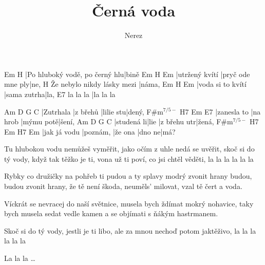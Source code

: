 \documentclass{song}
\title{Černá voda}
\author{Nerez}
\renewcommand{\-}{$^{7/5-}$}
\begin{document}
\strophe
Em                            H
|Po hluboký vodě, po černý hlu|bině
Em             H                Em
|utržený kvítí |pryč ode mne ply|ne,
                           H
Že nebylo nikdy lásky mezi |náma,
Em                H           Em
|voda si to kvítí |sama zutrha|la,
         E7
la la la |la la la
\endstrophe

Am        D        G         C
|Zutrhala |z břehů |lilie stu|dený,
F#m\-       H7       Em        E7
|zanesla to |na hrob |mýmu potě|šení,
Am         D    G           C
|studená li|lie |z břehu utr|žená,
F#m\-        H7       Em      H7     Em
|jak já vodu |poznám, |že ona |dno ne|má?
\endstrophe

\strophe*
Tu hlubokou vodu nemůžeš vyměřit,
jako očím z uhle nedá se uvěřit,
skoč si do tý vody, když tak těžko je ti,
vona už ti poví, co jsi chtěl věděti,
la la la la la la
\endstrophe

Rybky co družičky na pohřeb ti pudou
a ty splavy modrý zvonit hrany budou,
budou zvonit hrany, že tě není škoda,
neuměls’ milovat, vzal tě čert a voda.
\endstrophe

Víckrát se nevracej do naší světnice,
musela bych ždímat mokrý nohavice,
taky bych musela sedat vedle kamen
a se objímati s ňákým hastrmanem.
\endstrophe

\strophe*
Skoč si do tý vody, jestli je ti libo,
ale za mnou nechoď potom jaktěživo,
la la la la la la
\endstrophe

La la la \ldots{}
\endstrophe

\end{document}
